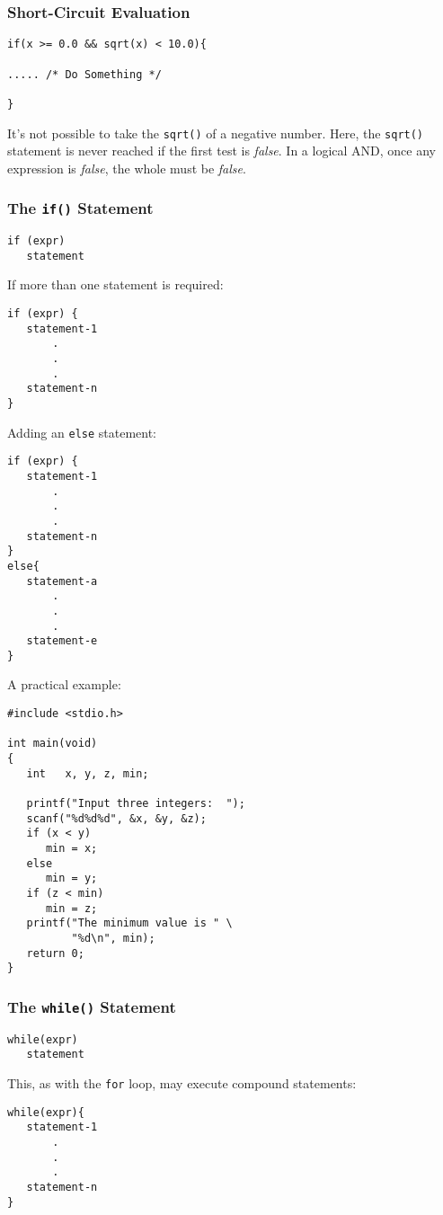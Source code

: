 \begin{frame}[fragile]
\frametitle{Short-Circuit Evaluation}

\begin{lstlisting}[style=basicc,numbers=none]
if(x >= 0.0 && sqrt(x) < 10.0){

..... /* Do Something */

}
\end{lstlisting}

It's not possible to take the \verb^sqrt()^ of a negative number.
Here, the \verb^sqrt()^ statement is never reached if the first test is {\it false}.
In a logical AND, once any expression is {\it false}, the whole must
be {\it false}.
\end{frame}


\begin{frame}[fragile]
\frametitle{The {\tt if()} Statement}

\begin{verbatim}
if (expr)
   statement
\end{verbatim}

If more than one statement is required:

\begin{verbatim}
if (expr) {
   statement-1
       .
       .
       .
   statement-n
}
\end{verbatim}

Adding an \verb^else^ statement:

\begin{verbatim}
if (expr) {
   statement-1
       .
       .
       .
   statement-n
}
else{
   statement-a
       .
       .
       .
   statement-e
}
\end{verbatim}

A practical example:

\begin{verbatim}
#include <stdio.h>

int main(void)
{
   int   x, y, z, min;

   printf("Input three integers:  ");
   scanf("%d%d%d", &x, &y, &z);
   if (x < y)
      min = x;
   else
      min = y;
   if (z < min)
      min = z;
   printf("The minimum value is " \
          "%d\n", min);
   return 0;
}
\end{verbatim}
\end{frame}

\begin{frame}[fragile]
\frametitle{The {\tt while()} Statement}

\begin{verbatim}
while(expr)
   statement
\end{verbatim}

This, as with the \verb^for^ loop, may execute compound statements:

\begin{verbatim}
while(expr){
   statement-1
       .
       .
       .
   statement-n
}
\end{verbatim}
\end{frame}

